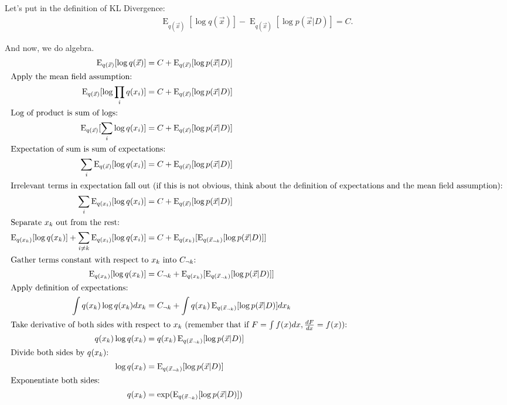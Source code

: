\documentclass[12pt]{article}
\newcommand{\E}{\operatorname{E}}
\begin{document}
Let's put in the definition of KL Divergence:
\begin{align}
    \E_{q(\vec{x})}[\log q(\vec{x})] - \E_{q(\vec{x})}[\log p(\vec{x}|D)] = C.
    \nonumber
\end{align}

And now, we do algebra.
\begin{align}
    \E_{q(\vec{x})}[\log q(\vec{x})] &= C + \E_{q(\vec{x})}[\log p(\vec{x}|D)]
    \nonumber \\
    \intertext{Apply the mean field assumption:}
    \E_{q(\vec{x})}[\log \prod_{i} q(x_i)] &= C + \E_{q(\vec{x})}[\log p(\vec{x}|D)]
    \nonumber \\
    \intertext{Log of product is sum of logs:}
    \E_{q(\vec{x})}[\sum_{i}\log q(x_i)] &= C + \E_{q(\vec{x})}[\log p(\vec{x}|D)]
    \nonumber \\
    \intertext{Expectation of sum is sum of expectations:}
    \sum_{i}\E_{q(\vec{x})}[\log q(x_i)] &= C + \E_{q(\vec{x})}[\log p(\vec{x}|D)]
    \nonumber \\
    \intertext{Irrelevant terms in expectation fall out (if this is not obvious,
    think about the definition of expectations and the mean field assumption):}
    \sum_{i}\E_{q(x_i)}[\log q(x_i)] &= C + \E_{q(\vec{x})}[\log p(\vec{x}|D)]
    \nonumber \\
    \intertext{Separate $x_k$ out from the rest:}
    \E_{q(x_k)}[\log q(x_k)] + \sum_{i \neq k}\E_{q(x_i)}[\log q(x_i)] &=
    C + \E_{q(x_k)}[\E_{q(\vec{x}_{\neg k})}[\log p(\vec{x}|D)]]
    \nonumber \\
    \intertext{Gather terms constant with respect to $x_k$ into $C_{\neg k}$:}
    \E_{q(x_k)}[\log q(x_k)] &=
    C_{\neg k} + \E_{q(x_k)}[\E_{q(\vec{x}_{\neg k})}[\log p(\vec{x}|D)]]
    \nonumber \\
    \intertext{Apply definition of expectations:}
    \int q(x_k)\log q(x_k)dx_{k} &=
    C_{\neg k} + \int q(x_k)\E_{q(\vec{x}_{\neg k})}[\log p(\vec{x}|D)]dx_{k}
    \nonumber \\
    \intertext{Take derivative of both sides with respect to $x_k$ (remember
    that if $F = \int f(x) dx, \frac{dF}{dx} = f(x)$):}
    q(x_k)\log q(x_k) &=
    q(x_k)\E_{q(\vec{x}_{\neg k})}[\log p(\vec{x}|D)]
    \nonumber \\
    \intertext{Divide both sides by $q(x_k)$:}
    \log q(x_k) &=
    \E_{q(\vec{x}_{\neg k})}[\log p(\vec{x}|D)]
    \nonumber \\
    \intertext{Exponentiate both sides:}
    q(x_k) &=
    \exp (\E_{q(\vec{x}_{\neg k})}[\log p(\vec{x}|D)])
\end{align}
\end{document}
